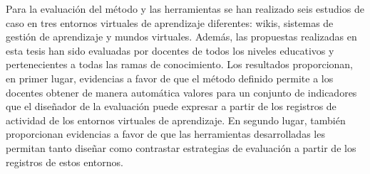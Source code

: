 \begin{resumen}
Para la evaluación del método y las herramientas se han realizado seis estudios de caso en tres entornos virtuales de aprendizaje diferentes: wikis, sistemas de gestión de aprendizaje y mundos virtuales. Además, las propuestas realizadas en esta tesis han sido evaluadas por docentes de todos los niveles educativos y pertenecientes a todas las ramas de conocimiento. Los resultados proporcionan, en primer lugar, evidencias a favor de que el método definido permite a los docentes obtener de manera automática valores para un conjunto de indicadores que el diseñador de la evaluación puede expresar a partir de los registros de actividad de los entornos virtuales de aprendizaje. En segundo lugar, también proporcionan evidencias a favor de que las herramientas desarrolladas les permitan tanto diseñar como contrastar estrategias de evaluación a partir de los registros de estos entornos.


\end{resumen}

